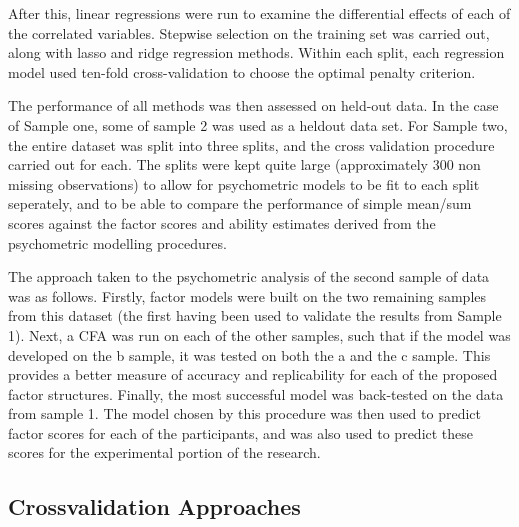 \documentclass{article}
\begin{document}
After this, linear regressions were run to examine the differential effects of each of the correlated variables. Stepwise selection on the training set was carried out, along with lasso and ridge regression  methods. Within each split, each regression model used ten-fold cross-validation to choose the optimal penalty criterion. 

The performance of all methods was then assessed on held-out data. In the case of Sample one, some of sample 2 was used as a heldout data set. For Sample two, the entire dataset was split into three splits, and the cross validation procedure carried out for each. The splits were kept quite large (approximately 300 non missing observations) to allow for psychometric models to be fit to each split seperately, and to be able to compare the performance of simple mean/sum scores against the factor scores and ability estimates derived from the psychometric modelling procedures. 

The approach taken to the psychometric analysis of the second sample of data was as follows.  Firstly, factor models were built on the two remaining samples from this dataset (the first having been used to validate the results from Sample 1).  Next, a CFA was run on each of the other samples, such that if the model was developed on the b sample, it was tested on both the a and the c sample.  This provides a better measure of accuracy and replicability for each of the proposed factor structures.  Finally, the most successful model was back-tested on the data from sample 1. The model chosen by this procedure was then used to predict factor scores for each of the participants, and was also used to predict these scores for the experimental portion of the research.

\subsection{Crossvalidation Approaches}
\label{sec:crossv-appr}


\end{document}
